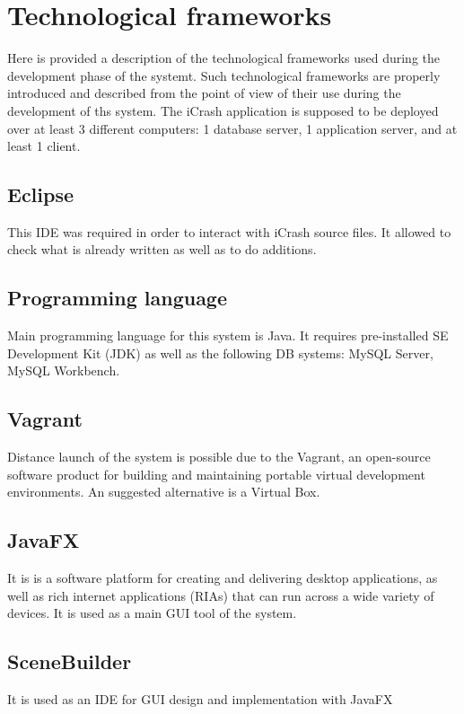 \chapter{Technological frameworks}
\label{chap:techFrm}


Here is provided a description of the technological frameworks used during the
development phase of the systemt. Such technological frameworks are properly
introduced and described from the point of view of their use during the
development of ths system. The iCrash application is supposed to be deployed
over at least 3 different computers: 1 database server, 1 application server,
and at least 1 client. 



\section{Eclipse}
\label{sec:Eclipse}
This IDE was required in order to interact with iCrash source files. It allowed
to check what is already written as well as to do additions. 


\section{Programming language}
\label{sec:Programming language}
Main programming language for this system is Java. It requires pre-installed SE
Development Kit (JDK) as well as the following DB systems: MySQL Server, MySQL
Workbench. 


\section{Vagrant}
\label{sec:Vagrant}
Distance launch of the system is possible due to the Vagrant, an open-source
software product for building and maintaining portable virtual development
environments. An suggested alternative is a Virtual Box.


\section{JavaFX}
\label{sec:JavaFX}
It is  is a software platform for creating and delivering desktop applications,
as well as rich internet applications (RIAs) that can run across a wide variety
of devices. It is used as a main GUI tool of the system.

\section{SceneBuilder}
\label{sec:SceneBuilder}
It is used as an IDE for GUI design and implementation with JavaFX








